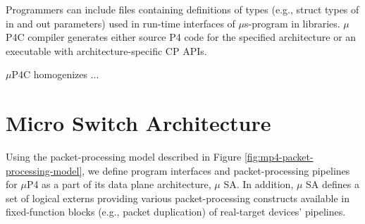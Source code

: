Programmers can include files containing definitions of types (e.g., struct types of in and out parameters) used in run-time interfaces of $\mu$s-program in libraries.
$\mu$P4C compiler generates either source P4 code for the specified architecture or an executable with architecture-specific CP APIs.


$\mu$P4C homogenizes ... 



\section{Micro Switch Architecture}
\label{section:micro-switch-architecture}
Using the packet-processing model described in Figure \ref{fig:mp4-packet-processing-model}, we define program interfaces and packet-processing pipelines for $\mu$P4 as a part of its data plane architecture, $\mu$ SA.
In addition, $\mu$ SA defines a set of logical externs providing various packet-processing constructs available in fixed-function blocks (e.g., packet duplication) of real-target devices' pipelines.


